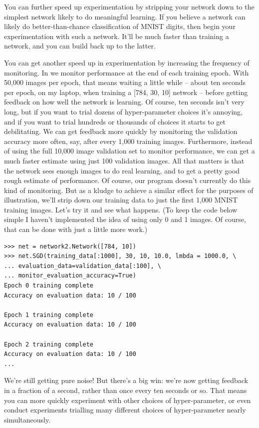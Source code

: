\documentclass[a4paper,twoside,10pt]{book}
\begin{document}
You can further speed up experimentation by stripping your network down to the simplest network likely to do meaningful learning. If you believe a \inline{[784, 10]} network can likely do better-than-chance classification of MNIST digits, then begin your experimentation with such a network. It'll be much faster than training a \inline{[784, 30, 10]} network, and you can build back up to the latter.

You can get another speed up in experimentation by increasing the frequency of monitoring. In  we monitor performance at the end of each training epoch. With 50,000 images per epoch, that means waiting a little while -- about ten seconds per epoch, on my laptop, when training a [784, 30, 10] network -- before getting feedback on how well the network is learning. Of course, ten seconds isn't very long, but if you want to trial dozens of hyper-parameter choices it's annoying, and if you want to trial hundreds or thousands of choices it starts to get debilitating. We can get feedback more quickly by monitoring the validation accuracy more often, say, after every 1,000 training images. Furthermore, instead of using the full 10,000 image validation set to monitor performance, we can get a much faster estimate using just 100 validation images. All that matters is that the network sees enough images to do real learning, and to get a pretty good rough estimate of performance. Of course, our program  doesn't currently do this kind of monitoring. But as a kludge to achieve a similar effect for the purposes of illustration, we'll strip down our training data to just the first 1,000 MNIST training images. Let's try it and see what happens. (To keep the code below simple I haven't implemented the idea of using only 0 and 1 images. Of course, that can be done with just a little more work.)
\begin{lstlisting}
>>> net = network2.Network([784, 10])
>>> net.SGD(training_data[:1000], 30, 10, 10.0, lmbda = 1000.0, \
... evaluation_data=validation_data[:100], \
... monitor_evaluation_accuracy=True)
Epoch 0 training complete
Accuracy on evaluation data: 10 / 100

Epoch 1 training complete
Accuracy on evaluation data: 10 / 100

Epoch 2 training complete
Accuracy on evaluation data: 10 / 100
...
\end{lstlisting}
We're still getting pure noise! But there's a big win: we're now getting feedback in a fraction of a second, rather than once every ten seconds or so. That means you can more quickly experiment with other choices of hyper-parameter, or even conduct experiments trialling many different choices of hyper-parameter nearly simultaneously.
\end{document}

